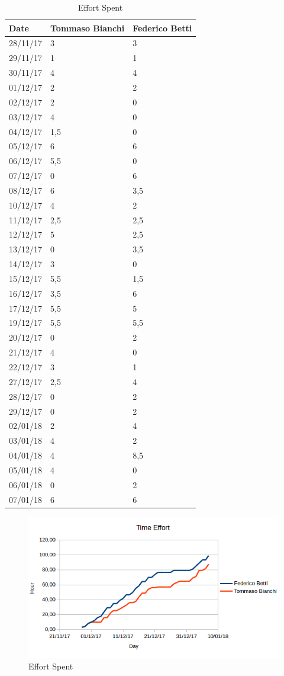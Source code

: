 \begin{table}[H]	
	\centering
	\def\arraystretch{1.25}
	\begin{tabular}{|m{5cm}|m{5cm}|m{5cm}|}
		\hline
		\textbf{Date} & \textbf{Tommaso Bianchi} &  \textbf{Federico Betti}\\ \hline
		28/11/17 &	3 &	3 \\ \hline
		29/11/17 &	1 &	1 \\ \hline
		30/11/17 &	4 &	4 \\ \hline
		01/12/17 &	2 &	2 \\ \hline
		02/12/17 &	2 & 0	 \\ \hline
		03/12/17 &	4 &  0\\ \hline
		04/12/17 &	1,5 & 0 \\ \hline
		05/12/17 &	6 &	6 \\ \hline
		06/12/17 &	5,5 & 0	 \\ \hline
		07/12/17 &	0 &	6 \\ \hline
		08/12/17 &	6 &	3,5 \\ \hline
		10/12/17 &	4 &	2 \\ \hline
		11/12/17 &	2,5 &	2,5 \\ \hline
		12/12/17 &	5 &	2,5 \\ \hline
		13/12/17 &	0 &	3,5 \\ \hline
		14/12/17 &	3 & 0	 \\ \hline
		15/12/17 &	5,5 &	1,5 \\ \hline
		16/12/17 &	3,5 &	6 \\ \hline
		17/12/17 &	5,5 &	5 \\ \hline
		19/12/17 &	5,5 &	5,5 \\ \hline
		20/12/17 &	0 &	2 \\ \hline
		21/12/17 &	4 & 0	 \\ \hline
		22/12/17 &	3 &	1 \\ \hline
		27/12/17 &	2,5 &	4 \\ \hline
		28/12/17 &	0 &	2 \\ \hline
		29/12/17 &	0 &	2 \\ \hline
		02/01/18 &	2 &	4 \\ \hline
		03/01/18 &	4 &	2 \\ \hline
		04/01/18 &	4 &	8,5 \\ \hline
		05/01/18 &	4 & 0	 \\ \hline
		06/01/18 &	0 &	2 \\ \hline
		07/01/18 &	6 &	6 \\ \hline
	\end{tabular}
	\caption{Effort Spent}
\end{table}



\begin{figure}[H]
	\centering\includegraphics[width=\textwidth]{Images/TimeEffort.png}
	\caption{Effort Spent}
\end{figure}
